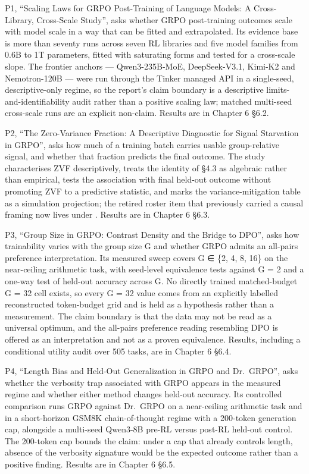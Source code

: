 \documentclass[12pt,a4paper]{report}
\newcommand{\longtok}[1]{\texttt{\seqsplit{#1}}}
\begin{document}
P1, ``Scaling Laws for GRPO Post-Training of Language Models: A
Cross-Library, Cross-Scale Study'', asks whether GRPO post-training
outcomes scale with model scale in a way that can be fitted and
extrapolated. Its evidence base is more than seventy runs across seven
RL libraries and five model families from 0.6B to 1T parameters, fitted
with saturating forms and tested for a cross-scale slope. The frontier
anchors --- Qwen3-235B-MoE, DeepSeek-V3.1, Kimi-K2 and Nemotron-120B ---
were run through the Tinker managed API in a single-seed,
descriptive-only regime, so the report's claim boundary is a descriptive
limits-and-identifiability audit rather than a positive scaling law;
matched multi-seed cross-scale runs are an explicit non-claim. Results
are in Chapter 6 §6.2.

P2, ``The Zero-Variance Fraction: A Descriptive Diagnostic for Signal
Starvation in GRPO'', asks how much of a training batch carries usable
group-relative signal, and whether that fraction predicts the final
outcome. The study characterises ZVF descriptively, treats the identity
of §4.3 as algebraic rather than empirical, tests the association with
final held-out outcome without promoting ZVF to a predictive statistic,
and marks the variance-mitigation table as a simulation projection; the
retired roster item that previously carried a causal framing now lives
under \longtok{archive/absorbed/R02\_\allowbreak{}main\_\allowbreak{}zvf/}. Results are in Chapter
6 §6.3.

P3, ``Group Size in GRPO: Contrast Density and the Bridge to DPO'', asks
how trainability varies with the group size G and whether GRPO admits an
all-pairs preference interpretation. Its measured sweep covers G ∈ \{2,
4, 8, 16\} on the near-ceiling arithmetic task, with seed-level
equivalence tests against G = 2 and a one-way test of held-out accuracy
across G. No directly trained matched-budget G = 32 cell exists, so
every G = 32 value comes from an explicitly labelled reconstructed
token-budget grid and is held as a hypothesis rather than a measurement.
The claim boundary is that the data may not be read as a universal
optimum, and the all-pairs preference reading resembling DPO is offered
as an interpretation and not as a proven equivalence. Results, including
a conditional utility audit over 505 tasks, are in Chapter 6 §6.4.

P4, ``Length Bias and Held-Out Generalization in GRPO and Dr.~GRPO'',
asks whether the verbosity trap associated with GRPO appears in the
measured regime and whether either method changes held-out accuracy. Its
controlled comparison runs GRPO against Dr.~GRPO on a near-ceiling
arithmetic task and in a short-horizon GSM8K chain-of-thought regime
with a 200-token generation cap, alongside a multi-seed Qwen3-8B pre-RL
versus post-RL held-out control. The 200-token cap bounds the claim:
under a cap that already controls length, absence of the verbosity
signature would be the expected outcome rather than a positive finding.
Results are in Chapter 6 §6.5.
\end{document}
